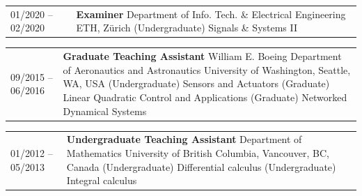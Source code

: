 \begin{tabular}{p{} p{}}
  01/2020 -- 02/2020 & \textbf{Examiner} \newline
                       Department of Info. Tech. \& Electrical Engineering \newline
                       ETH, Z\"{u}rich \newline
                       (Undergraduate) Signals \& Systems II 
\end{tabular}
\begin{tabular}{p{} p{}}
09/2015 -- 06/2016 & \textbf{Graduate Teaching Assistant}\newline
                           William E. Boeing Department of Aeronautics and Astronautics\newline
                           University of Washington, Seattle, WA, USA\newline
                              (Undergraduate) Sensors and Actuators \newline
                              (Graduate) Linear Quadratic Control and Applications \newline
                              (Graduate) Networked Dynamical Systems 
\end{tabular}
\begin{tabular}{p{} p{}}
01/2012 -- 05/2013 & \textbf{Undergraduate Teaching Assistant}\newline
                           Department of Mathematics\newline
                           University of British Columbia, Vancouver, BC, Canada\newline
                              (Undergraduate) Differential calculus \newline
                              (Undergraduate) Integral calculus 
\end{tabular}
\newpage
{}

